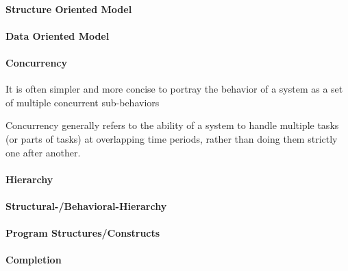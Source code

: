 \documentclass[english]{latex4ei/latex4ei_sheet}
\begin{document}
\paragraph{Structure Oriented Model}

\paragraph{Data Oriented Model}

\paragraph{Concurrency}
It is often simpler and more concise to portray the behavior of a system as a set of multiple concurrent sub-behaviors

Concurrency generally refers to the ability of a system to handle multiple tasks (or parts of tasks) at overlapping time periods, rather than doing them strictly one after another.

\paragraph{Hierarchy}

\paragraph{Structural-/Behavioral-Hierarchy}

\paragraph{Program Structures/Constructs}

\paragraph{Completion}
\end{document}
